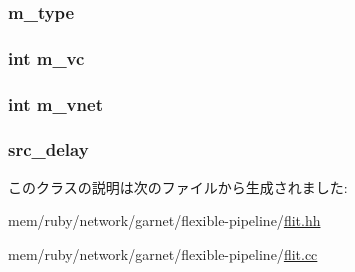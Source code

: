 \label{classflit_ac39faf9ea84c2e7518ba2f960c661636}
\hypertarget{classflit_aa57009042826e7caec1a969aaad4a591}{
\subsubsection[{m\_\-type}]{ {\bf m\_\-type}}}
\label{classflit_aa57009042826e7caec1a969aaad4a591}
\hypertarget{classflit_aff451e40c19f8624b8556d1524e0b76f}{
\subsubsection[{m\_\-vc}]{\setlength{\rightskip}{0pt plus 5cm}int {\bf m\_\-vc}}}
\label{classflit_aff451e40c19f8624b8556d1524e0b76f}
\hypertarget{classflit_a1834cf79dfe7f6b9d971ceb81bac5716}{
\subsubsection[{m\_\-vnet}]{\setlength{\rightskip}{0pt plus 5cm}int {\bf m\_\-vnet}}}
\label{classflit_a1834cf79dfe7f6b9d971ceb81bac5716}
\hypertarget{classflit_a54c59332d73cfbff1539be34bdd8703b}{
\subsubsection[{src\_\-delay}]{ {\bf src\_\-delay}}}
\label{classflit_a54c59332d73cfbff1539be34bdd8703b}


このクラスの説明は次のファイルから生成されました:\begin{DoxyCompactItemize}
\item 
mem/ruby/network/garnet/flexible-\/pipeline/\hyperlink{flit_8hh}{flit.hh}\item 
mem/ruby/network/garnet/flexible-\/pipeline/\hyperlink{flit_8cc}{flit.cc}\end{DoxyCompactItemize}
